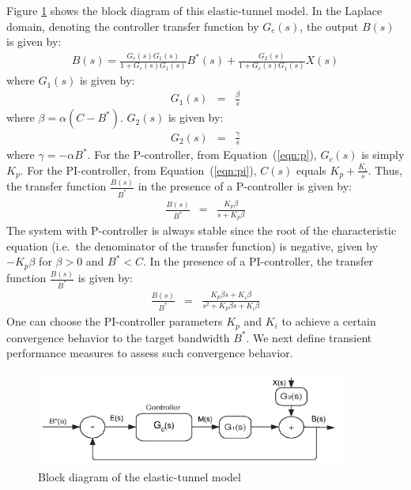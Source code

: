 \documentclass{article}
\begin{document}
\noindent
Figure \ref{fig:block1} shows the block diagram 
of this elastic-tunnel model.
In the Laplace domain,
denoting the controller transfer
function by $G_c(s)$, 
the output $B(s)$ is given by:
{\small
\begin{eqnarray} 
 \label{eqn:tf} B(s)= \frac{G_c(s)G_1(s)}{1+G_c(s)G_1(s)} B^*(s) +
   \frac{G_2(s)}{1+G_c(s)G_1(s)} X(s)
\end{eqnarray}
}
where $G_1(s)$ is given by:
\begin{eqnarray*} 
 \label{eqn:g1}    
   G_1(s) &=& \frac{\beta}{s}
\end{eqnarray*}
where $\beta = \alpha (C-B^*)$.
$G_2(s)$ is given by:
\begin{eqnarray*} 
 \label{eqn:g2}    
   G_2(s) &=& \frac{\gamma}{s}
\end{eqnarray*}
where $\gamma = -\alpha B^*$.
\noindent
For the P-controller, 
from Equation~(\ref{eqn:p}), $G_c(s)$ is simply $K_p$.
For the PI-controller, from Equation~(\ref{eqn:pi}),
$C(s)$
equals  $K_p + \frac{K_i}{s}$.
Thus,
the transfer function $\frac{B(s)}{B^*}$ 
in the presence of a  P-controller
is given by:
\begin{eqnarray*} 
 \label{eqn:tfp}    
    \frac{B(s)}{B^*} &=& \frac{K_p \beta}{s + K_p \beta}
\end{eqnarray*}
The system with P-controller is always stable
since the root of the characteristic equation 
(i.e.\ the denominator of the transfer function) is
negative, given by $-K_p \beta$ for $\beta > 0$ and $B^* < C$.
\noindent
In the presence of a PI-controller,
the transfer function $\frac{B(s)}{B^*}$ 
is given by: 
\begin{eqnarray*} 
 \label{eqn:tfpi} 
 \frac{B(s)}{B^*} &=& \frac{K_p\beta s + K_i\beta}
{s^2 + K_p\beta s + K_i\beta}
\end{eqnarray*}
One can choose the PI-controller parameters
$K_p$ and $K_i$ to achieve a certain convergence
behavior to the target bandwidth $B^*$.
We next define transient performance measures
to assess such convergence behavior.

\begin{figure}[htbp] %
   \centering
   \includegraphics[width=4in]{figures/tunnel-block1} 
\caption{Block diagram of the elastic-tunnel model} 
\label{fig:block1}
\end{figure}
\end{document}
